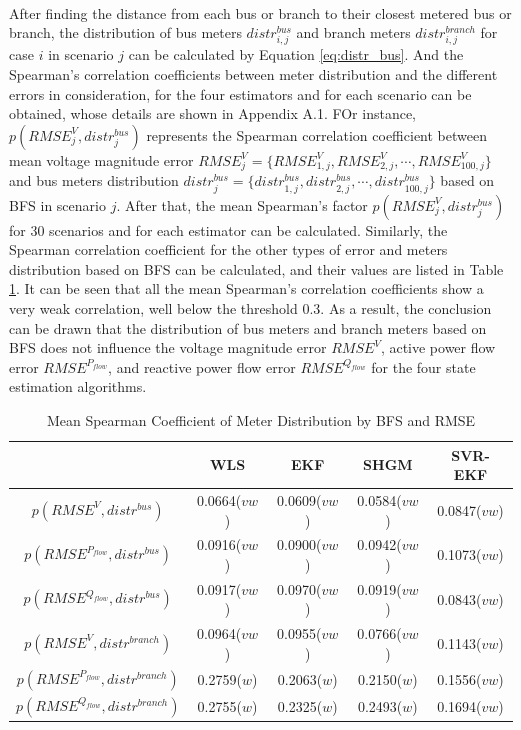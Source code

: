 \\After finding the distance from each bus or branch to their closest metered bus or branch, the distribution of bus meters $distr_{i,j}^{bus}$ and branch meters $distr_{i,j}^{branch}$ for case $i$ in scenario $j$ can be calculated by Equation \ref{eq:distr_bus}. And the Spearman's correlation coefficients between meter distribution and the different errors in consideration, for the four estimators and for each scenario can be obtained, whose details are shown in Appendix A.1. FOr instance, $p(RMSE_j^V,distr_j^{bus})$ represents the Spearman correlation coefficient between mean voltage magnitude error $RMSE_j^V=\{RMSE_{1,j}^V,RMSE_{2,j}^V,\cdots,RMSE_{100,j}^V \}$ and bus meters distribution $distr_j^{bus}=\{distr_{1,j}^{bus},distr_{2,j}^{bus},\cdots,distr_{100,j}^{bus} \}$ based on BFS in scenario $j$. After that, the mean Spearman's factor $p(RMSE_j^V,distr_j^{bus})$ for 30 scenarios and for  each estimator can be calculated. Similarly, the Spearman correlation coefficient for the other types of error and meters distribution based on BFS can be calculated, and their values are listed in Table \ref{tab:spearman_meter_distr_BFS}. It can be seen that all the mean Spearman's correlation coefficients show a very weak correlation, well below the threshold 0.3. As a result, the conclusion can be drawn that the distribution of bus meters and branch meters based on BFS does not influence the voltage magnitude error $RMSE^V$, active power flow error $RMSE^{P_{flow}}$, and reactive power flow error $RMSE^{Q_{flow}}$ for the four state estimation algorithms.

    \begin{table}[!h]
        \centering
        \begin{tabular}{c|c|c|c|c}
             & WLS & EKF & SHGM & SVR-EKF\\ \hline
            $p(RMSE^V,distr^{bus})$ & 0.0664($vw$) & 0.0609($vw$) & 0.0584($vw$) &  0.0847($vw$)\\
            $p(RMSE^{P_{flow}},distr^{bus})$ & 0.0916($vw$) & 0.0900($vw$) & 0.0942($vw$) &  0.1073($vw$)\\
            $p(RMSE^{Q_{flow}},distr^{bus})$ & 0.0917($vw$) & 0.0970($vw$) & 0.0919($vw$) &  0.0843($vw$)\\
            $p(RMSE^V,distr^{branch})$ & 0.0964($vw$) & 0.0955($vw$) & 0.0766($vw$) &  0.1143($vw$)\\
            $p(RMSE^{P_{flow}},distr^{branch})$ & 0.2759($w$) & 0.2063($w$) & 0.2150($w$) &  0.1556($vw$)\\
            $p(RMSE^{Q_{flow}},distr^{branch})$ & 0.2755($w$) & 0.2325($w$) & 0.2493($w$) &  0.1694($vw$)\\
        \end{tabular}
        \caption{Mean Spearman Coefficient of Meter Distribution by BFS and RMSE}
        \label{tab:spearman_meter_distr_BFS}
    \end{table}



